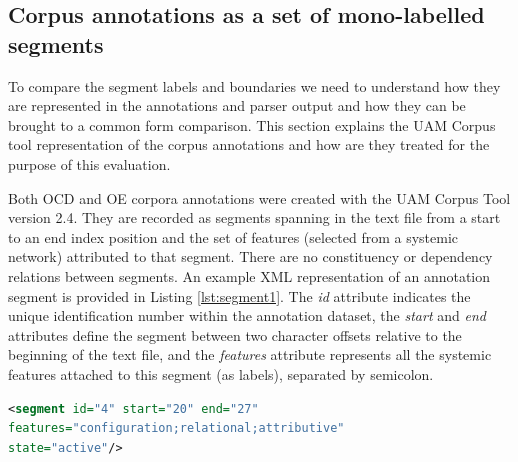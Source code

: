 \subsection{Corpus annotations as a set of mono-labelled segments}

    To compare the segment labels and boundaries we need to understand how they are represented in the annotations and parser output and how they can be brought to a common form comparison. This section explains the UAM Corpus tool representation of the corpus annotations and how are they treated for the purpose of this evaluation.
    
    Both OCD and OE corpora annotations were created with the UAM Corpus Tool \citep{ODonnell2008,ODonnell2008a} version 2.4. They are recorded as segments spanning in the text file from a start to an end index position and the set of features (selected from a systemic network) attributed to that segment. There are no constituency or dependency relations between segments. An example XML representation of an annotation segment is provided in Listing \ref{lst:segment1}. The \textit{id} attribute indicates the unique identification number within the annotation dataset, the \textit{start} and \textit{end} attributes define the segment between two character offsets relative to the beginning of the text file, and the \textit{features} attribute represents all the systemic features attached to this segment (as labels), separated by semicolon. 

\begin{minipage}{\linewidth}
\begin{lstlisting}[language=XML,basicstyle=\small\tt,frame=single,caption=Segment example in UAM corpus tool,label=lst:segment1]
<segment id="4" start="20" end="27" 
features="configuration;relational;attributive" 
state="active"/>
\end{lstlisting}
\end{minipage}

